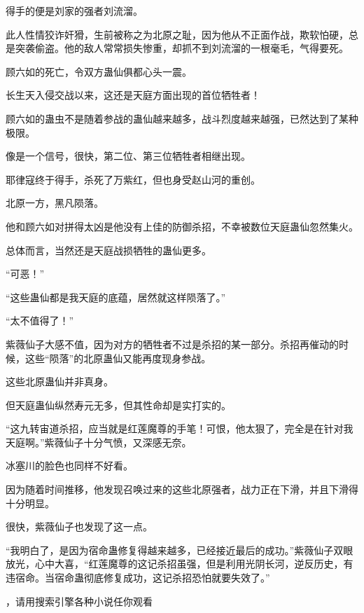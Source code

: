 \begin{this_body}
得手的便是刘家的强者刘流溜。

此人性情狡诈奸猾，生前被称之为北原之耻，因为他从不正面作战，欺软怕硬，总是突袭偷盗。他的敌人常常损失惨重，却抓不到刘流溜的一根毫毛，气得要死。

顾六如的死亡，令双方蛊仙俱都心头一震。

长生天入侵交战以来，这还是天庭方面出现的首位牺牲者！

顾六如的蛊虫不是随着参战的蛊仙越来越多，战斗烈度越来越强，已然达到了某种极限。

像是一个信号，很快，第二位、第三位牺牲者相继出现。

耶律寇终于得手，杀死了万紫红，但也身受赵山河的重创。

北原一方，黑凡陨落。

他和顾六如对拼得太凶是他没有上佳的防御杀招，不幸被数位天庭蛊仙忽然集火。

总体而言，当然还是天庭战损牺牲的蛊仙更多。

“可恶！”

“这些蛊仙都是我天庭的底蕴，居然就这样陨落了。”

“太不值得了！”

紫薇仙子大感不值，因为对方的牺牲者不过是杀招的某一部分。杀招再催动的时候，这些“陨落”的北原蛊仙又能再度现身参战。

这些北原蛊仙并非真身。

但天庭蛊仙纵然寿元无多，但其性命却是实打实的。

“这九转宙道杀招，应当就是红莲魔尊的手笔！可恨，他太狠了，完全是在针对我天庭啊。”紫薇仙子十分气愤，又深感无奈。

冰塞川的脸色也同样不好看。

因为随着时间推移，他发现召唤过来的这些北原强者，战力正在下滑，并且下滑得十分明显。

很快，紫薇仙子也发现了这一点。

“我明白了，是因为宿命蛊修复得越来越多，已经接近最后的成功。”紫薇仙子双眼放光，心中大喜，“红莲魔尊的这记杀招虽强，但是利用光阴长河，逆反历史，有违宿命。当宿命蛊彻底修复成功，这记杀招恐怕就要失效了。”

，请用搜索引擎各种小说任你观看

\end{this_body}

